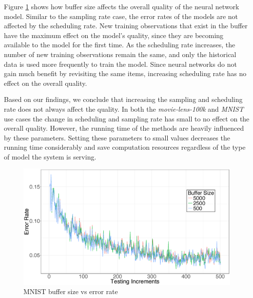\documentclass{vldb}
\begin{document}
Figure \ref{fig:mnist-buffer-size} shows how buffer size affects the overall quality of the neural network model.
Similar to the sampling rate case, the error rates of the models are not affected by the scheduling rate.
New training observations that exist in the buffer have the maximum effect on the model's quality, since they are becoming available to the model for the first time.
As the scheduling rate increases, the number of new training observations remain the same, and only the historical data is used more frequently to train the model.
Since neural networks do not gain much benefit by revisiting the same items, increasing scheduling rate has no effect on the overall quality.

Based on our findings, we conclude that increasing the sampling and scheduling rate does not always affect the quality.
In both the \textit{movie-lens-100k} and \textit{MNIST} use cases the change in scheduling and sampling rate has small to no effect on the overall quality.
However, the running time of the methods are heavily influenced by these parameters.
Setting these parameters to small values decreases the running time considerably and save computation resources regardless of the type of model the system is serving.


\begin{figure}[!ht]
\centering
\includegraphics[width=\columnwidth]{../images/experiment-results/mnist-buffersize-improved.eps}
\caption{MNIST buffer size vs error rate}
\label{fig:mnist-buffer-size}
\end{figure}
\end{document}

